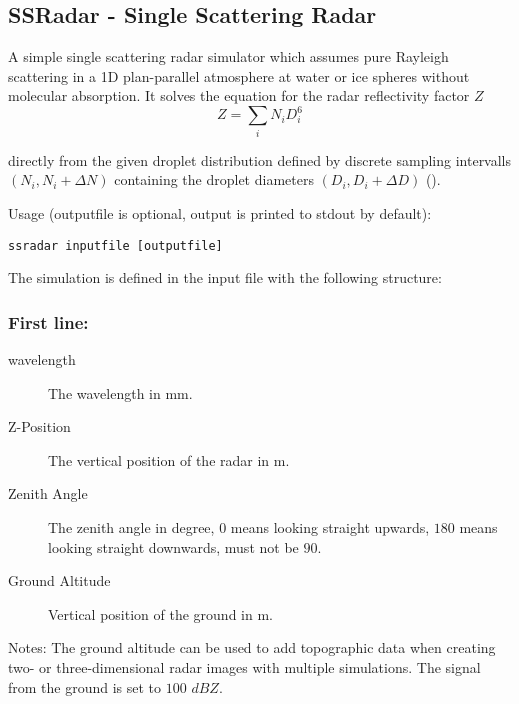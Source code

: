 \subsection{SSRadar - Single Scattering Radar }

A simple single scattering radar simulator which assumes pure Rayleigh scattering
in a 1D plan-parallel atmosphere at water or ice spheres without molecular absorption. 
It solves the equation for the radar reflectivity factor $Z$
$$
Z = \sum_i N_i D_i^6
$$

directly from the given droplet distribution defined by discrete sampling intervalls
$\left(N_i, N_i + \Delta N\right)$ containing the droplet diameters $\left(D_i, D_i 
+ \Delta D\right)$ (\citet{Rinehart2010}).

Usage (outputfile is optional, output is printed to stdout by default):
\begin{Verbatim}[fontsize=\footnotesize]
ssradar inputfile [outputfile]
\end{Verbatim}
The simulation is defined in the input file with the following structure:
\subsubsection {First line:}
\begin{description}
\item[wavelength] The wavelength in mm.
\item[Z-Position] The vertical position of the radar in m.
\item[Zenith Angle] The zenith angle in degree, $0$ means looking straight upwards, 
$180$ means looking straight downwards, must not be $90$.
\item[Ground Altitude] Vertical position of the ground in m.
\end{description}
Notes: The ground altitude can be used to add topographic data when creating two- or 
three-dimensional radar images with multiple simulations. The signal from the ground is
set to $100$ $dBZ$.
